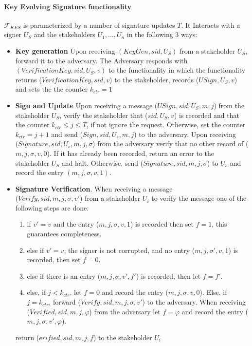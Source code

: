 \paragraph{Key Evolving Signature functionality} $\mathcal{F}_{KES}$ is parameterized by a number of signature updates $T$. It Interacts with a signer $U_S$ and the stakeholders $U_1, \dots, U_n$ in the following 3 ways:
\begin{itemize}
    \item \textbf{Key generation} Upon receiving $(KeyGen, sid, U_S)$ from a stakeholder $U_S$, forward it to the adversary. The Adversary responds with $(VerificationKey, sid, U_S, v)$ to the functionality in which the functionality returns ($VerificationKey, sid, v$) to the stakeholder, records ($USign, U_S, v$) and sets the the counter $k_{ctr} = 1$
    \item \textbf{Sign and Update} Upon receiving a message ($USign, sid, U_S, m, j$) from the stakeholder $U_S$, verify the stakeholder that ($sid, U_S, v$) is recorded and that the counter $k_{ctr} \leq j \leq T$, if not ignore the request. Otherwise, set the counter $k_{ctr} = j + 1$ and send ($Sign, sid, U_s, m, j$) to the adversary. Upon receiving \\ ($Signature, sid, U_s, m, j, \sigma$) from the adversary verify that no other record of ($m, j, \sigma, v, 0$). If it has already been recorded, return an error to the stakeholder $U_S$ and halt. Otherwise, send ($Signature, sid, m, j, \sigma$) to $U_s$ and record the entry $(m, j, \sigma, v ,1)$.
    \item \textbf{Signature Verification}. When receiving a message \\ ($Verify, sid, m, j, \sigma, v'$) from a stakeholder $U_i$ to verify the message one of the following steps are done:
    \begin{enumerate}
        \item if $v' = v$ and the entry ($m, j, \sigma, v, 1$) is recorded then set $f = 1$, this guarantees completeness.
        \item else if $v' = v$, the signer is not corrupted, and no entry ($m, j , \sigma', v, 1$) is recorded, then set $f = 0$.
        \item else if there is an entry ($m, j, \sigma, v', f'$) is recorded, then let $f = f'$.
        \item else, if $j < k_{ctr}$, let $f = 0$ and record the entry ($m, j, \sigma, v, 0$). Else, if $j = k_{ctr}$, forward ($Verify, sid, m, j, \sigma, v'$) to the adversary. When receiving ($Verified, sid, m, j, \varphi$) from the adversary let $f = \varphi$ and record the entry ($m, j, \sigma, v', \varphi$).
    \end{enumerate}
    return ($erified, sid, m, j, f$) to the stakeholder $U_i$ 
\end{itemize}

